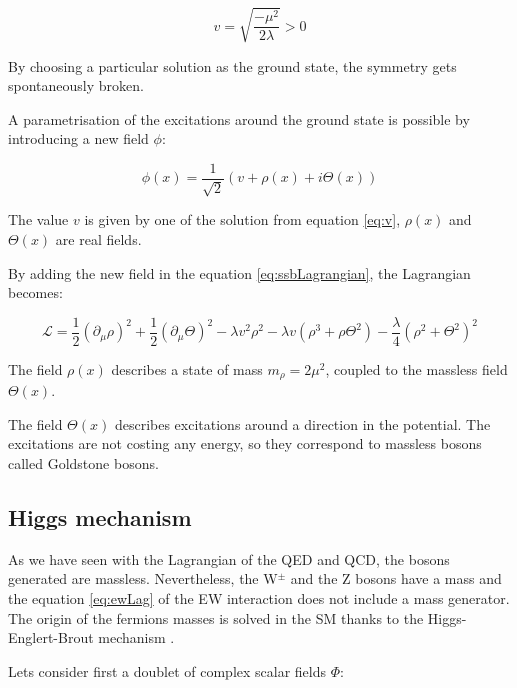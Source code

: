     \begin{equation}
      v = \sqrt{\frac{- \mu^2}{2\lambda}} > 0
      \label{eq:v}
    \end{equation}

    By choosing a particular solution as the ground state, the symmetry gets spontaneously broken.

    A parametrisation of the excitations around the ground state is possible by introducing a new field $\phi$:

    \begin{equation}
      \phi(x) = \frac{1}{\sqrt{2}} \left( v + \rho(x) + i\Theta(x) \right)
    \end{equation}

    The value $v$ is given by one of the solution from equation \ref{eq:v}, $\rho(x)$ and $\Theta(x)$ are real fields.

    By adding the new field in the equation \ref{eq:ssbLagrangian}, the Lagrangian becomes:

    \begin{equation}
      \mathcal{L} = \frac{1}{2} (\partial_{\mu}\rho)^2 + \frac{1}{2}(\partial_{\mu}\Theta)^2 - \lambda v^2 \rho^2 - \lambda v (\rho^3 +\rho \Theta^2) - \frac{\lambda}{4}(\rho^2 + \Theta^2)^2
    \end{equation}

    The field $\rho(x)$ describes a state of mass $m_{\rho} = 2 \mu^2$, coupled to the massless field $\Theta(x)$.

    The field $\Theta(x)$ describes excitations around a direction in the potential.
    The excitations are not costing any energy, so they correspond to massless bosons called Goldstone bosons.


    \subsection{Higgs mechanism}
    \label{sec:higgsMechanism}

    As we have seen with the Lagrangian of the QED and QCD, the bosons generated are massless. Nevertheless, the W$^{\pm}$ and the Z bosons have a mass and the equation \ref{eq:ewLag} of the EW interaction does not include a mass generator. 
    The origin of the fermions masses is solved in the \gls{SM} thanks to the Higgs-Englert-Brout mechanism \cite{PhysRevLett.13.508}\cite{1964PhRvL..13..321E}.

    Lets consider first a doublet of complex scalar fields $\Phi$:
    
